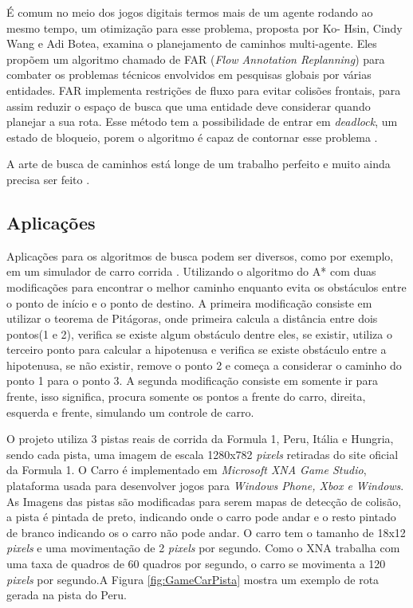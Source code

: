 É comum no meio dos jogos digitais termos mais de um agente rodando ao mesmo tempo, um otimização para esse problema, proposta por Ko- Hsin, Cindy Wang e Adi Botea, examina o planejamento de caminhos multi-agente. Eles propõem um algoritmo chamado de FAR (\textit{Flow Annotation Replanning}) para combater os problemas técnicos envolvidos em pesquisas globais por várias entidades.
FAR implementa restrições de fluxo para evitar colisões frontais, para assim reduzir o espaço de busca que uma entidade deve considerar quando planejar a sua rota. Esse método tem a possibilidade de entrar em \textit{deadlock}, um estado de bloqueio, porem o algoritmo é capaz de contornar esse problema \cite{Ko-hsin}.

A arte de busca de caminhos está longe de um trabalho perfeito e muito ainda precisa ser feito \cite{Pontevia}.

\subsection{Aplicações}
Aplicações para os algoritmos de busca podem ser diversos, como por exemplo, em um simulador de carro corrida \cite{JungTing}. Utilizando o algoritmo do A* com duas modificações para encontrar o melhor caminho enquanto evita os obstáculos entre o ponto de início e o ponto de destino. 
A primeira modificação consiste em utilizar o teorema de Pitágoras, onde primeira calcula a distância entre dois pontos(1 e 2), verifica se existe algum obstáculo dentre eles, se existir, utiliza o terceiro ponto para calcular a hipotenusa e verifica se existe obstáculo entre a hipotenusa, se não existir, remove o ponto 2 e começa a considerar o caminho do ponto 1 para o ponto 3. A segunda modificação consiste em somente ir para frente, isso significa, procura somente os pontos a frente do carro, direita, esquerda e frente, simulando um controle de carro.

O projeto utiliza 3 pistas reais de corrida da Formula 1, Peru, Itália e Hungria, sendo cada pista, uma imagem de escala 1280x782 \textit{pixels} retiradas do site oficial da Formula 1. O Carro é implementado em \textit{Microsoft XNA Game Studio}, plataforma usada para desenvolver jogos para \textit{Windows Phone, Xbox e Windows}. As Imagens das pistas são modificadas para serem mapas de detecção de colisão, a pista é pintada de preto, indicando onde o carro pode andar e o resto pintado de branco indicando os o carro não pode andar. O carro tem o tamanho de 18x12 \textit{pixels} e uma movimentação de 2 \textit{pixels} por segundo. Como o XNA trabalha com uma taxa de quadros de 60 quadros por segundo, o carro se movimenta a 120 \textit{pixels} por segundo.A Figura \ref{fig:GameCarPista} mostra um exemplo de rota gerada na pista do Peru.

